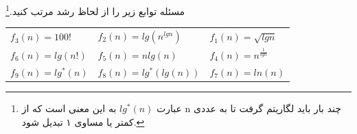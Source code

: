 ‌مسئله
توابع زیر را از لحاظ رشد مرتب کنید.\footnote{
عبارت
 $lg^*(n)$
  به این معنی است که از n چند بار باید لگاریتم گرفت تا به عددی کمتر یا مساوی ۱ تبدیل شود.
}


\begin{large}
	\begin{center}
		\begin{tabular}{l l l}
			$f_3(n) = 100! $&
			$f_2(n) = lg(n^{lg n}) $&
			$f_1(n) = \sqrt{lg n}$\\
			$f_6(n) = lg(n!) $&
			$f_5(n) = nlg(n)$&
			$f_4(n) = n^{\frac{1}{lg n}}$\\
			$f_9(n) = lg^{*}(n)$ &
			$f_8(n) = lg^{*}(lg(n))$&
			$f_7(n) = ln(n)$
		\end{tabular}
	\end{center}
\end{large}


















